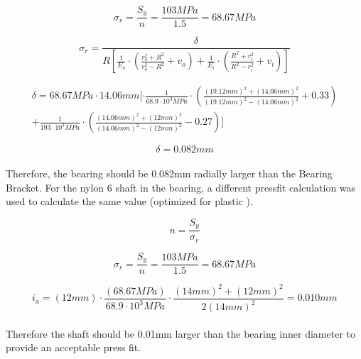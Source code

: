 \documentclass[../main.tex]{subfiles}
\begin{document}
\begin{equation}
{\sigma_r}=\frac{S_y}{n}=\frac{103MPa}{1.5}=68.67MPa
\end{equation}

\begin{equation}
\sigma_r=\frac{\delta}{R[\frac{1}{E_o}\cdot{}(\frac{r_o^2+R^2}{r_o^2-R^2}+v_o)+\frac{1}{E_i}\cdot{}(\frac{R^2+r_i^2}{R^2-r_i^2}+v_i)]}
\end{equation}	 
	
\begin{multline}
\delta = {68.67MPa}\cdot{}14.06mm[\cdot{}\frac{1}{68.9\cdot{10^3MPa}}\cdot{(\frac{(19.12mm)^2+(14.06mm)^2}{(19.12mm)^2-(14.06mm)^2}+0.33)}  
	\\ +\frac{1}{193\cdot{10^3MPa}}\cdot{(\frac{(14.06mm)^2+(12mm)^2}{(14.06mm)^2-(12mm)^2}-0.27)}]
\end{multline}

\begin{equation}
	\delta=0.082mm
\end{equation}
\\
Therefore, the bearing should be 0.082mm radially larger than the Bearing Bracket.
For the nylon 6 shaft in the bearing, a different pressfit calculation was used to calculate the same value (optimized for plastic \cite{pressfit}).

\begin{equation}
	n=\frac{S_y}{\sigma_r}
\end{equation}

\begin{equation}
{\sigma_r}=\frac{S_y}{n}=\frac{103MPa}{1.5}=68.67MPa
\end{equation}

\begin{equation}
i_a=(12mm)\cdot{}\frac{(68.67MPa)}{68.9\cdot{}10^3MPa}\cdot{}
\frac{(14mm)^2+(12mm)^2}{2(14mm)^2}=0.010mm
\end{equation}
\\
Therefore the shaft should be 0.01mm larger than the bearing inner diameter to provide an acceptable press fit.
\end{document}
